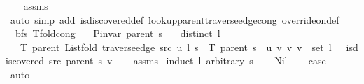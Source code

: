 \begin{isabellebody}
\endisataginvisible
{\isafoldinvisible}%
%
\isadeliminvisible
\isanewline
%
\endisadeliminvisible
%
\isadelimproof
\ \ %
\endisadelimproof
%
\isatagproof
{}\isamarkupfalse%
\ assms\isanewline
\ \ \isamarkupfalse%
\ {\isacharparenleft}{\kern0pt}auto\ simp\ add{\isacharcolon}{\kern0pt}\ is{\isacharunderscore}{\kern0pt}discovered{\isacharunderscore}{\kern0pt}def\ lookup{\isacharunderscore}{\kern0pt}parent{\isacharunderscore}{\kern0pt}traverse{\isacharunderscore}{\kern0pt}edge{\isacharunderscore}{\kern0pt}cong\ override{\isacharunderscore}{\kern0pt}on{\isacharunderscore}{\kern0pt}def{\isacharparenright}{\kern0pt}%
\endisatagproof
{\isafoldproof}%
%
\isadelimproof
\isanewline
%
\endisadelimproof
\isanewline
{}\isamarkupfalse%
\ {\isacharparenleft}{\kern0pt}\ bfs{\isacharparenright}{\kern0pt}\ T{\isacharunderscore}{\kern0pt}fold{\isacharunderscore}{\kern0pt}cong{\isacharcolon}{\kern0pt}\isanewline
\ \ \ {\isachardoublequoteopen}P{\isacharunderscore}{\kern0pt}invar\ {\isacharparenleft}{\kern0pt}parent\ s{\isacharparenright}{\kern0pt}{\isachardoublequoteclose}\isanewline
\ \ \ {\isachardoublequoteopen}distinct\ l{\isachardoublequoteclose}\isanewline
\ \ \ {\isachardoublequoteopen}T\ {\isacharparenleft}{\kern0pt}parent\ {\isacharparenleft}{\kern0pt}List{\isachardot}{\kern0pt}fold\ {\isacharparenleft}{\kern0pt}traverse{\isacharunderscore}{\kern0pt}edge\ src\ u{\isacharparenright}{\kern0pt}\ l\ s{\isacharparenright}{\kern0pt}{\isacharparenright}{\kern0pt}\ {\isacharequal}{\kern0pt}\ T\ {\isacharparenleft}{\kern0pt}parent\ s{\isacharparenright}{\kern0pt}\ {\isasymunion}\ {\isacharbraceleft}{\kern0pt}{\isacharparenleft}{\kern0pt}u{\isacharcomma}{\kern0pt}\ v{\isacharparenright}{\kern0pt}\ {\isacharbar}{\kern0pt}v{\isachardot}{\kern0pt}\ v\ {\isasymin}\ set\ l\ {\isasymand}\ {\isasymnot}\ is{\isacharunderscore}{\kern0pt}discovered\ src\ {\isacharparenleft}{\kern0pt}parent\ s{\isacharparenright}{\kern0pt}\ v{\isacharbraceright}{\kern0pt}{\isachardoublequoteclose}\isanewline
%
\isadelimproof
\ \ %
\endisadelimproof
%
\isatagproof
{}\isamarkupfalse%
\ assms\isanewline
{}\isamarkupfalse%
\ {\isacharparenleft}{\kern0pt}induct\ l\ arbitrary{\isacharcolon}{\kern0pt}\ s{\isacharparenright}{\kern0pt}\isanewline
\ \ \isamarkupfalse%
\ Nil\isanewline
\ \ \isamarkupfalse%
\ {\isacharquery}{\kern0pt}case\isanewline
\ \ \ \ \isamarkupfalse%
\ auto\isanewline
{}\isamarkupfalse%

\end{isabellebody}
